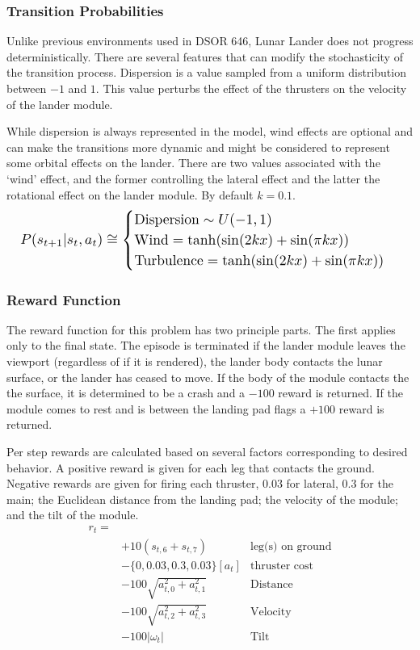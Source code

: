 \documentclass[journal]{IEEEtran}
\begin{document}
\subsubsection{Transition Probabilities}
Unlike previous environments used in DSOR 646, Lunar Lander does not progress deterministically.
There are several features that can modify the stochasticity of the transition process.
Dispersion is a value sampled from a uniform distribution between \(-1\) and \(1\).
This value perturbs the effect of the thrusters on the velocity of the lander module.

While dispersion is always represented in the model, wind effects are optional and can make the
transitions more dynamic and might be considered to represent some orbital effects on the lander.
There are two values associated with the `wind' effect, 
and  the former controlling the lateral effect and the latter
the rotational effect on the lander module. By default \(k=0.1\).
\begin{equation*}
    \resizebox{\linewidth}{!}{
        \(P(s_{t+1}|s_t,a_t) \cong 
        \begin{cases}
            \text{Dispersion} \sim U(-1,1) \\
            \text{Wind} = \tanh(\sin(2 k x) + \sin(\pi k x)) \\
            \text{Turbulence} = \tanh(\sin(2 k x) + \sin(\pi k x))
        \end{cases}\) 
    }
\end{equation*}

\subsubsection{Reward Function}
The reward function for this problem has two principle parts.
The first applies only to the final state. The episode is terminated 
if the lander module leaves the viewport (regardless of if it is rendered),
the lander body contacts the lunar surface, or the lander has ceased to move.
If the body of the module contacts the the surface, 
it is determined to be a crash and a \(-100\) reward is returned. 
If the module comes to rest and is between the landing pad flags a \(+100\) reward is returned.

Per step rewards are calculated based on several factors corresponding to desired behavior.
A positive reward is given for each leg that contacts the ground. Negative rewards are given
for firing each thruster, \(0.03\) for lateral, \(0.3\) for the main; the Euclidean 
distance from the landing pad; the velocity of the module; and the tilt of the module.
\begin{align*}
    r_t = \\
    & +10 (s_{t,6} + s_{t,7})   & \text{leg(s) on ground} \\
    & - \{0,0.03,0.3,0.03\}[a_t] & \text{thruster cost} \\
    & - 100\sqrt{a_{t,0}^2+a_{t,1}^2} & \text{Distance} \\
    & - 100\sqrt{a_{t,2}^2+a_{t,3}^2} & \text{Velocity} \\
    & - 100|\omega_t| & \text{Tilt}
\end{align*}
\end{document}
